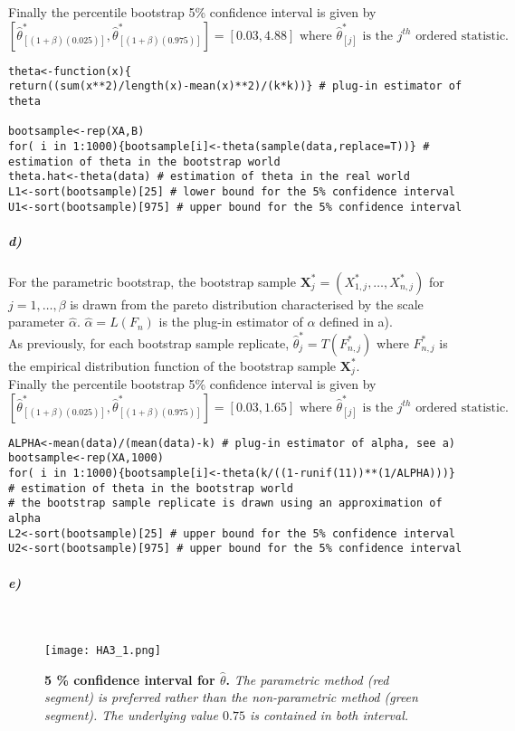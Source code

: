 \documentclass{article}
\begin{document}
Finally the percentile bootstrap 5\% confidence interval is given by $$\left[\widehat{\theta}^*_{[(1+\beta)(0.025)]} , \widehat{\theta}^*_{[(1+\beta)(0.975)]} \right]=[0.03,4.88]\text{ where $\widehat{\theta}^*_{[j]}$ is the $j^{th}$ ordered statistic.} $$
\begin{footnotesize}
\begin{verbatim}
theta<-function(x){
return((sum(x**2)/length(x)-mean(x)**2)/(k*k))} # plug-in estimator of theta

bootsample<-rep(XA,B)
for( i in 1:1000){bootsample[i]<-theta(sample(data,replace=T))} # estimation of theta in the bootstrap world
theta.hat<-theta(data) # estimation of theta in the real world
L1<-sort(bootsample)[25] # lower bound for the 5% confidence interval
U1<-sort(bootsample)[975] # upper bound for the 5% confidence interval
\end{verbatim}
\end{footnotesize}

\subparagraph{d)}
For the parametric bootstrap, the bootstrap sample $\pmb{X}_j^*=(X_{1,j}^*,\ldots,X_{n,j}^*)$ for $j=1,\ldots,\beta$ is drawn from the pareto distribution characterised by the scale parameter $\widehat{\alpha}$. $\widehat{\alpha}=L(F_{n})$ is the plug-in estimator of $\alpha$ defined in a). \\

As previously, for each bootstrap sample replicate, $\widehat{\theta}_j^*=T(F_{n,j}^*)$ where $F_{n,j}^*$ is the empirical distribution function of the bootstrap sample $\pmb{X}_j^*$. \\

Finally the percentile bootstrap 5\% confidence interval is given by $$\left[\widehat{\theta}^*_{[(1+\beta)(0.025)]} , \widehat{\theta}^*_{[(1+\beta)(0.975)]} \right]=[0.03,1.65]\text{ where $\widehat{\theta}^*_{[j]}$ is the $j^{th}$ ordered statistic.} $$
\begin{footnotesize}
\begin{verbatim}
ALPHA<-mean(data)/(mean(data)-k) # plug-in estimator of alpha, see a)
bootsample<-rep(XA,1000)
for( i in 1:1000){bootsample[i]<-theta(k/((1-runif(11))**(1/ALPHA)))} # estimation of theta in the bootstrap world
# the bootstrap sample replicate is drawn using an approximation of alpha
L2<-sort(bootsample)[25] # upper bound for the 5% confidence interval
U2<-sort(bootsample)[975] # upper bound for the 5% confidence interval
\end{verbatim}
\end{footnotesize}
\subparagraph{e)}
\
\begin{figure}[H]
	  \centering
  	\texttt{[image: HA3\_1.png]}
  	\caption{\textbf{5 \% confidence interval for $\widehat{\theta}$.} \textsl{The parametric method (red segment) is preferred rather than the non-parametric method (green segment). The underlying value $0.75$ is contained in both interval.} \ }
	\end{figure}
\end{document}
